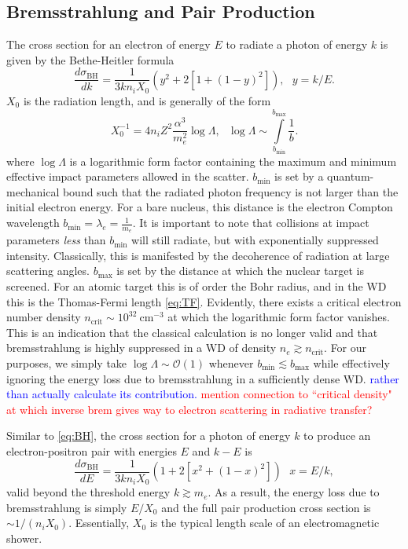 \documentclass[twocolumn,showpacs,preprintnumbers,amsmath,amssymb,prd]{revtex4}
\newcommand{\OO}{\mathcal{O}}
\begin{document}
\begin{appendices}
\subsection*{Bremsstrahlung and Pair Production}
The cross section for an electron of energy $E$ to radiate a photon of energy $k$ is given by the Bethe-Heitler formula
\begin{equation}
\label{eq:BH}
\frac{d \sigma_\text{BH}}{dk} = \frac{1}{3 k n_i X_0} (y^2+2 [1+ (1-y)^2]), ~~~ y = k/E.
\end{equation}
$X_0$ is the radiation length, and is generally of the form
\begin{equation}
X_0^{-1} = 4 n_i Z^2 \frac{\alpha^3}{m_e^2} \log{\Lambda}, ~~~ \log{\Lambda} \sim \int \limits_{b_\text{min}}^{b_\text{max}} \frac{1}{b}.
\end{equation}
where $\log{\Lambda}$ is a logarithmic form factor containing the maximum and minimum effective impact parameters allowed in the scatter. $b_\text{min}$ is set by a quantum-mechanical bound such that the radiated photon frequency is not larger than the initial electron energy. For a bare nucleus, this distance is the electron Compton wavelength $b_\text{min} = \lambda_e = \frac{1}{m_e}$. It is important to note that collisions at impact parameters \emph{less} than $b_\text{min}$ will still radiate, but with exponentially suppressed intensity. Classically, this is manifested by the decoherence of radiation at large scattering angles. $b_\text{max}$ is set by the distance at which the nuclear target is screened. For an atomic target this is of order the Bohr radius, and in the WD this is the Thomas-Fermi length \eqref{eq:TF}. Evidently, there exists a critical electron number density $n_\text{crit} \sim 10^{32} ~\text{cm}^{-3}$ at which the logarithmic form factor vanishes. This is an indication that the classical calculation is no longer valid and that bremsstrahlung is highly suppressed in a WD of density $n_e \gtrsim n_\text{crit}$. For our purposes, we simply take $\log{\Lambda} \sim \OO(1)$ whenever $b_\text{min} \lesssim b_\text{max}$ while effectively ignoring the energy loss due to bremsstrahlung in a sufficiently dense WD. \textcolor{blue}{rather than actually calculate its contribution.} \textcolor{red}{mention connection to ``critical density" at which inverse brem gives way to electron scattering in radiative transfer?}

Similar to \eqref{eq:BH}, the cross section for a photon of energy $k$ to produce an electron-positron pair with energies $E$ and $k-E$ is
\begin{equation}
\label{eq:PP}
\frac{d \sigma_\text{BH}}{dE} = \frac{1}{3 k n_i X_0} (1+ 2[x^2+ (1-x)^2]) ~~~ x = E/k,
\end{equation}
valid beyond the threshold energy $k \gtrsim m_e$. As a result, the energy loss due to bremsstrahlung is simply $E/X_0$ and the full pair production cross section is $\sim 1/(n_i X_0)$. Essentially, $X_0$ is the typical length scale of an electromagnetic shower.


\end{appendices}
\end{document}
